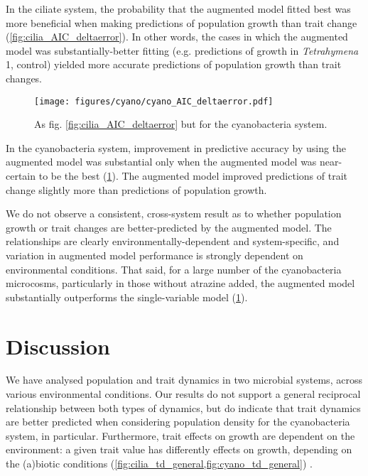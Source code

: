 \documentclass{article}
\begin{document}
In the ciliate system, the probability that the augmented model fitted best was more beneficial when making predictions of population growth than trait change (\cref{fig:cilia_AIC_deltaerror}). In other words, the cases in which the augmented model was substantially-better fitting (e.g. predictions of growth in \textit{Tetrahymena} 1, control) yielded more accurate predictions of population growth than trait changes.

\begin{figure}[H]
    \centering
    \texttt{[image: figures/cyano/cyano\_AIC\_deltaerror.pdf]}
    \caption{As fig. \ref{fig:cilia_AIC_deltaerror} but for the cyanobacteria system.}
  \label{fig:cyano_AIC_deltaerror}
\end{figure}

In the cyanobacteria system, improvement in predictive accuracy by using the augmented model was substantial only when the augmented model was near-certain to be the best (\cref{fig:cyano_AIC_deltaerror}). The augmented model improved predictions of trait change slightly more than predictions of population growth.

We do not observe a consistent, cross-system result as to whether population growth or trait changes are better-predicted by the augmented model. The relationships are clearly environmentally-dependent and system-specific, and variation in augmented model performance is strongly dependent on environmental conditions. That said, for a large number of the cyanobacteria microcosms, particularly in those without atrazine added, the augmented model substantially outperforms the single-variable model (\cref{fig:cyano_AIC_deltaerror}).

\section{Discussion}

We have analysed population and trait dynamics in two microbial systems, across various environmental conditions. Our results do not support a general reciprocal relationship between both types of dynamics, but do indicate that trait dynamics are better predicted when considering population density for the cyanobacteria system, in particular. Furthermore, trait effects on growth are dependent on the environment: a given trait value has differently effects on growth, depending on the (a)biotic conditions (\cref{fig:cilia_td_general,fig:cyano_td_general}) \cite{Gibert2022,Wieczynski2021}.
\end{document}
